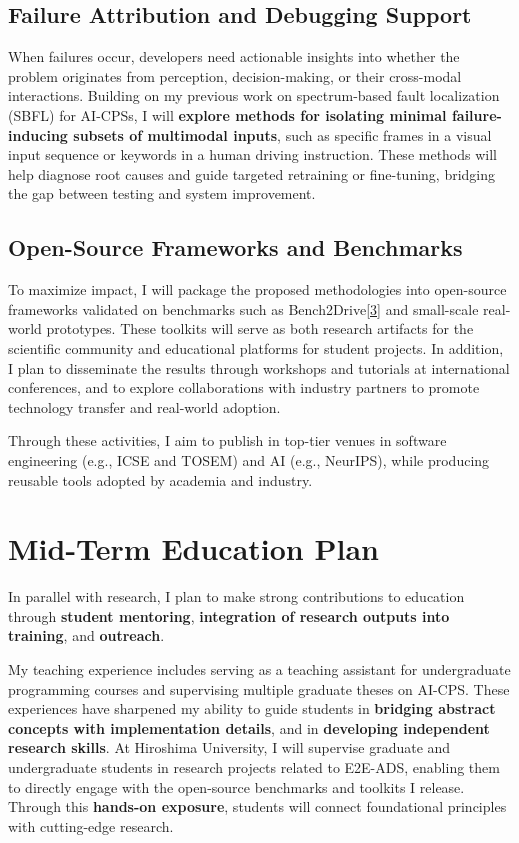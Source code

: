 \documentclass[12pt,a4paper]{article}
\begin{document}
\subsection{Failure Attribution and Debugging Support}

When failures occur, developers need actionable insights into whether the problem originates from perception, decision-making, or their cross-modal interactions. Building on my previous work on spectrum-based fault localization (SBFL) for AI-CPSs, I will \textbf{explore methods for isolating minimal failure-inducing subsets of multimodal inputs}, such as specific frames in a visual input sequence or keywords in a human driving instruction. These methods will help diagnose root causes and guide targeted retraining or fine-tuning, bridging the gap between testing and system improvement.

\subsection{Open-Source Frameworks and Benchmarks}

To maximize impact, I will package the proposed methodologies into open-source frameworks validated on benchmarks such as Bench2Drive\hyperlink{paper3}{[3]} and small-scale real-world prototypes. These toolkits will serve as both research artifacts for the scientific community and educational platforms for student projects. In addition, I plan to disseminate the results through workshops and tutorials at international conferences, and to explore collaborations with industry partners to promote technology transfer and real-world adoption.

Through these activities, I aim to publish in top-tier venues in software engineering (e.g., ICSE and TOSEM) and AI (e.g., NeurIPS), while producing reusable tools adopted by academia and industry.

\section{Mid-Term Education Plan}
 
In parallel with research, I plan to make strong contributions to education through \textbf{student mentoring}, \textbf{integration of research outputs into training}, and \textbf{outreach}.

My teaching experience includes serving as a teaching assistant for undergraduate programming courses and supervising multiple graduate theses on AI-CPS. These experiences have sharpened my ability to guide students in \textbf{bridging abstract concepts with implementation details}, and in \textbf{developing independent research skills}. At Hiroshima University, I will supervise graduate and undergraduate students in research projects related to E2E-ADS, enabling them to directly engage with the open-source benchmarks and toolkits I release. Through this \textbf{hands-on exposure}, students will connect foundational principles with cutting-edge research.
\end{document}
